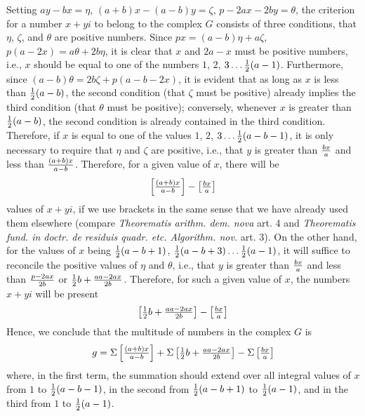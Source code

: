 \documentclass[twoside,12pt]{memoir}
\let\oldfrac\frac
\def\frac#1#2{\mathchoice{\tfrac{#1}{#2}}{\oldfrac{#1}{#2}}{\genfrac{}{}{}{2}{#1}{#2\mathstrut}}{\genfrac{}{}{}{3}{#1}{#2\mathstrut}}}
\begin{document}
Setting \(a y-b x=\eta\), \((a+b) x-(a-b) y=\zeta\), \(p-2 a x-2 b y=\theta\), the criterion for a number \(x+yi\) to belong to the complex \(G\) consists of three conditions, that \(\eta\), \(\zeta\), and \(\theta\) are positive numbers. Since \(p x=(a-b) \eta+a \zeta\), \(p(a-2 x)=a \theta+2 b \eta\), it is clear that \(x\) and \(2a-x\) must be positive numbers, i{.}e{.}, \(x\) should be equal to one of the numbers \(1\), \(2\), \(3\ldots \frac{1}{2}(a-1)\). Furthermore, since \((a-b) \theta=2 b \zeta+p(a-b-2 x)\), it is evident that as long as \(x\) is less than \(\frac{1}{2}(a-b)\), the second condition (that \(\zeta\) must be positive) already implies the third condition (that \(\theta\) must be positive); conversely, whenever \(x\) is greater than \(\frac{1}{2}(a-b)\), the second condition is already contained in the third condition. Therefore, if \(x\) is equal to one of the values \(1\), \(2\), \(3\ldots \frac{1}{2}(a-b-1)\), it is only necessary to require that \(\eta\) and \(\zeta\) are positive, i{.}e{.}, that \(y\) is greater than \(\frac{b x}{a}\) and less than \(\frac{(a+b) x}{a-b}\). Therefore, for a given value of \(x\), there will be
\[\left[\frac{(a+b) x}{a-b}\right]-\left[\frac{b x}{a}\right]\]
values of \(x+yi\), if we use brackets in the same sense that we have already used them elsewhere (compare \textit{Theorematis arithm. dem. nova} art. 4 and \textit{Theorematis fund{.} in doctr. de residuis quadr. etc{.} Algorithm. nov.} art. 3). On the other hand, for the values of \(x\) being \(\frac{1}{2}(a-b+1)\), \(\frac{1}{2}(a-b+3)\ldots \frac{1}{2}(a-1)\), it will suffice to reconcile the positive values of \(\eta\) and \(\theta\), i{.}e{.}, that \(y\) is greater than \(\frac{b x}{a}\) and less than \(\frac{p-2 a x}{2 b}\) or \(\frac{1}{2} b+\frac{a a-2 a x}{2 b}\). Therefore, for such a given value of \(x\), the numbers \(x+yi\) will be present
\[\left[\frac{1}{2} b+\frac{a a-2 a x}{2 b}\right]-\left[\frac{b x}{a}\right]\]
Hence, we conclude that the multitude of numbers in the complex \(G\) is
\[g=\Sigma\left[\frac{(a+b) x}{a-b}\right]+\Sigma\left[\frac{1}{2} b+\frac{a a-2 a x}{2 b}\right]-\Sigma\left[\frac{b x}{a}\right]\]
where, in the first term, the summation should extend over all integral values of \(x\) from \(1\) to \(\frac{1}{2}(a-b-1)\), in the second from \(\frac{1}{2}(a-b+1)\) to \(\frac{1}{2}(a-1)\), and in the third from \(1\) to \(\frac{1}{2}(a-1)\).
%
\end{document}
